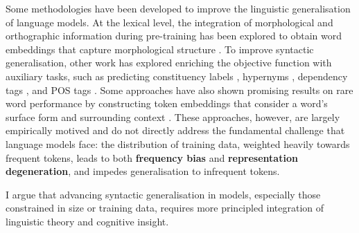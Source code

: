 Some methodologies have been developed to improve the linguistic generalisation of language models. At the lexical level, the integration of morphological and orthographic information during pre-training has been explored to obtain word embeddings that capture morphological structure \citep{salle2018incorporating, vulic2017morphfitting, cotterel2015morphological, bhatia2016morphological, botha2014compositional}. To improve syntactic generalisation, other work has explored enriching the objective function with auxiliary tasks, such as predicting constituency labels \citep{wang2023language}, hypernyms \citep{bai2022better}, dependency tags \citep{cui2022lert}, and POS tags \citep{diehlmartinez2023climb}. Some approaches have also shown promising results on rare word performance by constructing token embeddings that consider a word's surface form and surrounding context \citep{schick2019attentive, schick2020rare}. These approaches, however, are largely empirically motived and do not directly address the fundamental challenge that language models face: the distribution of training data, weighted heavily towards frequent tokens, leads to both \textbf{frequency bias} and \textbf{representation degeneration}, and impedes generalisation to infrequent tokens.

I argue that advancing syntactic generalisation in models, especially those constrained in size or training data, requires more principled integration of linguistic theory and cognitive insight.




